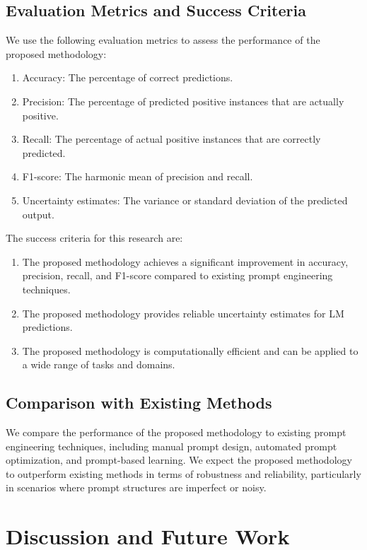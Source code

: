 \documentclass{article}
\begin{document}
\subsection{Evaluation Metrics and Success Criteria}
We use the following evaluation metrics to assess the performance of the proposed methodology:

\begin{enumerate}
    \item Accuracy: The percentage of correct predictions.
    \item Precision: The percentage of predicted positive instances that are actually positive.
    \item Recall: The percentage of actual positive instances that are correctly predicted.
    \item F1-score: The harmonic mean of precision and recall.
    \item Uncertainty estimates: The variance or standard deviation of the predicted output.
\end{enumerate}

The success criteria for this research are:

\begin{enumerate}
    \item The proposed methodology achieves a significant improvement in accuracy, precision, recall, and F1-score compared to existing prompt engineering techniques.
    \item The proposed methodology provides reliable uncertainty estimates for LM predictions.
    \item The proposed methodology is computationally efficient and can be applied to a wide range of tasks and domains.
\end{enumerate}

\subsection{Comparison with Existing Methods}
We compare the performance of the proposed methodology to existing prompt engineering techniques, including manual prompt design, automated prompt optimization, and prompt-based learning. We expect the proposed methodology to outperform existing methods in terms of robustness and reliability, particularly in scenarios where prompt structures are imperfect or noisy.

\section{Discussion and Future Work}
\end{document}
